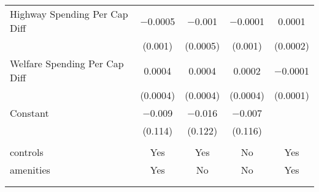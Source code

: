 \begin{table}[!htbp]
\begin{tabular}{@{\extracolsep{5pt}}lcccc}
  Highway Spending Per Cap Diff & $-$0.0005 & $-$0.001 & $-$0.0001 & 0.0001 \\ 
  & (0.001) & (0.0005) & (0.001) & (0.0002) \\ 
  Welfare Spending Per Cap Diff & 0.0004 & 0.0004 & 0.0002 & $-$0.0001 \\ 
  & (0.0004) & (0.0004) & (0.0004) & (0.0001) \\ 
  Constant & $-$0.009 & $-$0.016 & $-$0.007 &  \\ 
  & (0.114) & (0.122) & (0.116) &  \\ 
 \hline \\[-1.8ex] 
controls & Yes & Yes & No & Yes \\ 
amenities & Yes & No & No & Yes \\ 
\hline \\[-1.8ex] 
\hline 
\hline \\[-1.8ex] 
\end{tabular} 
\end{table} 
